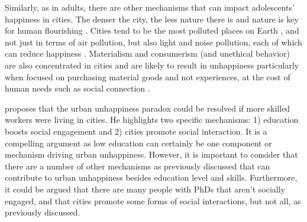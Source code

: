 \documentclass[10pt, letterpaper]{article}
\begin{document}
\begin{spacing}{1.4}
Similarly, as in adults,  there are other mechanisms that can impact
adolescents' happiness in cities. The denser the city, the less nature there is 
\citep{aokCityBook15} and nature is key for human flourishing \citep{pretty12}. Cities tend to be the most polluted places on Earth %
\citep{meyer13}, and not just in terms of air pollution, but also light and
noise pollution, each of which can reduce happiness \citep{signoretta19,poonCL18jan29,leeTT16feb13,metcalfeCL16jun10,weinhold12,rehdanz08,welsch05,york03}. Materialism and consumerism (and unethical behavior) are also concentrated in cities \citep[e.g.,][]{aok-sizeFetish17,okulicz2022materialism,morris21,wirth38} and
 are likely to result in unhappiness particularly when focused on purchasing
 material goods and not experiences,  at the cost of human needs such as social connection
 \citep[e.g.,][]{frank12,leonard10,vanboven05,burroughs02,dumludag21}.%
  

%
\citet{morrison2024resolving} proposes that the urban unhappiness paradox could
be resolved if more skilled workers were living in cities. He highlights two
specific mechanisms: 1) education boosts social engagement and 2) cities promote
social interaction. It is a compelling argument as low education can certainly be
one component or mechanism driving urban unhappiness. However, it is important
to consider that there are a number of other mechanisms as previously discussed
that can contribute to urban unhappiness besides education level and
skills. Furthermore, it could be argued that there are many people with PhDs
that aren't socially engaged, and that cities promote some forms of social
interactions, but not all, as previously discussed.

 

\end{spacing}
\end{document}

